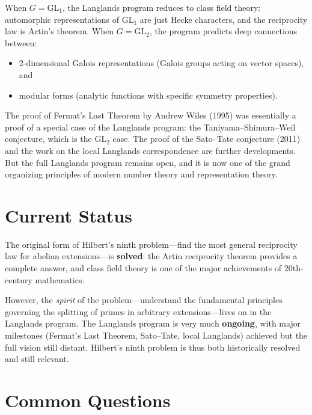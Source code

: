 When $G = \mathrm{GL}_1$, the Langlands program reduces to class field theory: automorphic representations of $\mathrm{GL}_1$ are just Hecke characters, and the reciprocity law is Artin's theorem. When $G = \mathrm{GL}_2$, the program predicts deep connections between:
\begin{itemize}
    \item 2-dimensional Galois representations (Galois groups acting on vector spaces), and
    \item modular forms (analytic functions with specific symmetry properties).
\end{itemize}

The proof of Fermat's Last Theorem by Andrew Wiles (1995) was essentially a proof of a special case of the Langlands program: the Taniyama--Shimura--Weil conjecture, which is the $\mathrm{GL}_2$ case. The proof of the Sato--Tate conjecture (2011) and the work on the local Langlands correspondence are further developments. But the full Langlands program remains open, and it is now one of the grand organizing principles of modern number theory and representation theory.

\section{Current Status}

\begin{solvedbox}
The original form of Hilbert's ninth problem---find the most general reciprocity law for abelian extensions---is \textbf{solved}: the Artin reciprocity theorem provides a complete answer, and class field theory is one of the major achievements of 20th-century mathematics.

However, the \emph{spirit} of the problem---understand the fundamental principles governing the splitting of primes in arbitrary extensions---lives on in the Langlands program. The Langlands program is very much \textbf{ongoing}, with major milestones (Fermat's Last Theorem, Sato--Tate, local Langlands) achieved but the full vision still distant. Hilbert's ninth problem is thus both historically resolved and still relevant.
\end{solvedbox}

\section*{Common Questions}

